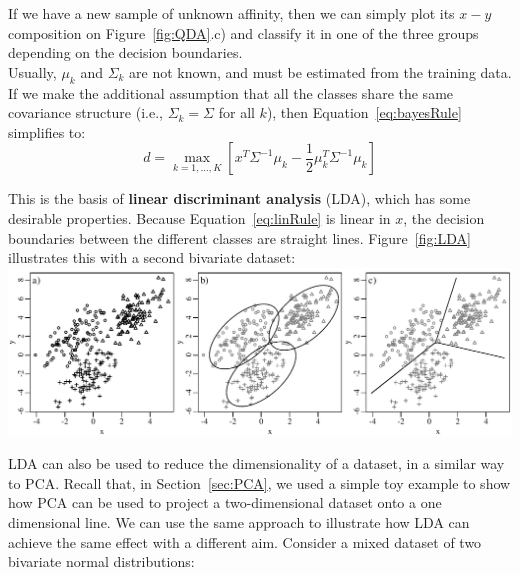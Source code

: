 If we have a new sample of unknown affinity, then we can simply plot
its $x-y$ composition on Figure~\ref{fig:QDA}.c) and classify it in
one of the three groups depending on the decision boundaries.\\

Usually, $\mu_k$ and $\Sigma_k$ are not known, and must be estimated
from the training data.  If we make the additional assumption that all
the classes share the same covariance structure (i.e., $\Sigma_k =
\Sigma$ for all $k$), then Equation~\ref{eq:bayesRule} simplifies to:
\begin{equation}
  \label{eq:linRule}
d = \underset{k=1,\ldots,K}{\max}\left[
x^T\Sigma^{-1}\mu_k-\frac{1}{2}\mu_k^T\Sigma^{-1}\mu_k \right]
\end{equation}

This is the basis of \textbf{linear discriminant analysis} (LDA),
which has some desirable properties.  Because
Equation~\ref{eq:linRule} is linear in $x$, the decision boundaries
between the different classes are straight lines. Figure~\ref{fig:LDA}
illustrates this with a second bivariate dataset:\\

\noindent\includegraphics[width=\linewidth]{../figures/LDA.pdf}
\begingroup {}
\label{fig:LDA}
\endgroup

LDA can also be used to reduce the dimensionality of a dataset, in a
similar way to PCA. Recall that, in Section~\ref{sec:PCA}, we used a
simple toy example to show how PCA can be used to project a
two-dimensional dataset onto a one dimensional line. We can use the
same approach to illustrate how LDA can achieve the same effect with a
different aim. Consider a mixed dataset of two bivariate normal
distributions:\\

